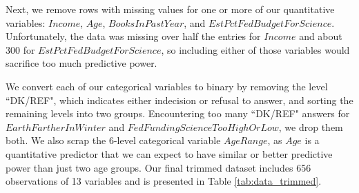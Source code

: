 \par \bigskip Next, we remove rows with missing values for one or more of our quantitative variables: $Income$, $Age$, $BooksInPastYear$, and $EstPctFedBudgetForScience$. Unfortunately, the data was missing over half the entries for $Income$ and about 300 for $EstPctFedBudgetForScience$, so including either of those variables would sacrifice too much predictive power.

\newpage

\par \bigskip We convert each of our categorical variables to binary by removing the level ``DK/REF", which indicates either indecision or refusal to answer, and sorting the remaining levels into two groups. Encountering too many ``DK/REF" answers for $EarthFartherInWinter$ and $FedFundingScienceTooHighOrLow$, we drop them both. We also scrap the 6-level categorical variable $AgeRange$, as $Age$ is a quantitative predictor that we can expect to have similar or better predictive power than just two age groups. Our final trimmed dataset includes 656 observations of 13 variables and is presented in Table \ref{tab:data_trimmed}.

\vspace{.2in}

